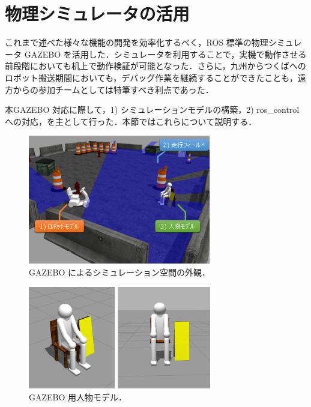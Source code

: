 \documentclass[10pt,a4paper]{jarticle}
\begin{document}
\section{物理シミュレータの活用}
\label{sec:simulation}

これまで述べた様々な機能の開発を効率化するべく，ROS 標準の物理シミュレータ GAZEBO \cite{gazebo} を活用した．シミュレータを利用することで，実機で動作させる前段階においても机上で動作検証が可能となった．さらに，九州からつくばへのロボット搬送期間においても，デバッグ作業を継続することができたことも，遠方からの参加チームとしては特筆すべき利点であった．

本GAZEBO 対応に際して，1) シミュレーションモデルの構築，2) ros\_control への対応，を主として行った．本節ではこれらについて説明する．

\begin{figure}[ht]
    \centering
    \includegraphics[width=8cm]{./fig/png/simulation_summary.png}
    \caption{GAZEBO によるシミュレーション空間の外観．}
    \label{simulation_summary}
\end{figure}


\begin{figure}[ht]
    \centering
    \includegraphics[width=8cm]{./fig/png/human_model.png}
    \caption{GAZEBO 用人物モデル．}
    \label{human_model}
\end{figure}
\end{document}
